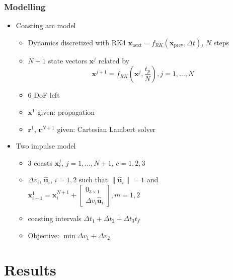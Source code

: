 \documentclass{beamer}
\begin{document}
\begin{frame}
    \frametitle{Modelling}

    \begin{itemize}\pause
        \item Coasting arc model\pause
        \begin{itemize}
            \item Dynamics discretized with RK4 \(\mathbf{x}_{\text{next}} = f_{RK}(\mathbf{x}_{\text{prev}}, \Delta t)\), \(N\) steps\pause
            \item \(N+1\) state vectors \(\mathbf{x}^j\) related by
            \begin{equation}
                 \mathbf{x}^{j+1} = f_{RK}(\mathbf{x}^j, \frac{t_p}{N}), j = 1, \dots, N
            \end{equation}\pause
            \item 6 DoF left\pause
            \item \(\mathbf{x}^1\) given: propagation\pause
            \item \(\mathbf{r}^1\), \(\mathbf{r}^{N+1}\) given: Cartesian Lambert solver\pause
        \end{itemize}
        \item Two impulse model\pause
        \begin{itemize}
            \item 3 coasts \(\mathbf{x}^j_c\), \(j=1,\dots,N+1\), \(c=1,2,3\)\pause
            \item \(\Delta v_i\), \(\hat{\mathbf{u}}_i\), \(i = 1, 2\) such that \(\lVert \hat{\mathbf{u}}_i \rVert = 1\) and \(\mathbf{x}_{i+1}^1 = \mathbf{x}_i^{N+1} + \begin{bmatrix}
                0_{3\times1} \\ \Delta v_i \hat{\mathbf{u}}_i
            \end{bmatrix}, m=1, 2\)\pause
            \item coasting intervals \(\Delta t_1 + \Delta t_2 + \Delta t_3 t_f\)\pause
            \item Objective: \(\min \Delta v_1 + \Delta v_2\)
        \end{itemize}
    \end{itemize}
\end{frame}

\section{Results}
\end{document}
